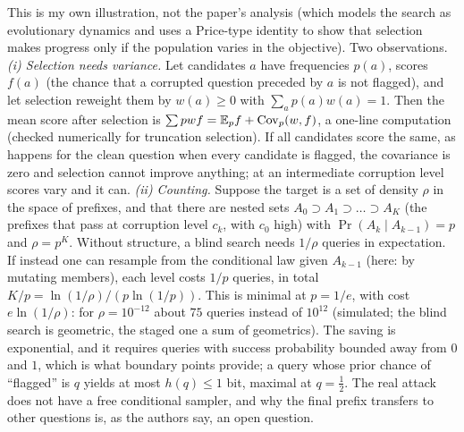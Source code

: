 \begin{beyond}\label{box:L8-curriculum}
This is my own illustration, not the paper's analysis (which models the search as evolutionary dynamics and uses a Price-type identity to show that selection makes progress only if the population varies in the objective). Two observations.
\emph{(i) Selection needs variance.} Let candidates $a$ have frequencies $p(a)$, scores $f(a)$ (the chance that a corrupted question preceded by $a$ is not flagged), and let selection reweight them by $w(a)\ge0$ with $\sum_ap(a)w(a)=1$. Then the mean score after selection is $\sum pwf=\mathbb{E}_pf+\operatorname{Cov}_p(w,f)$, a one-line computation (checked numerically for truncation selection). If all candidates score the same, as happens for the clean question when every candidate is flagged, the covariance is zero and selection cannot improve anything; at an intermediate corruption level scores vary and it can.
\emph{(ii) Counting.} Suppose the target is a set of density $\rho$ in the space of prefixes, and that there are nested sets $A_0\supset A_1\supset\dots\supset A_K$ (the prefixes that pass at corruption level $c_k$, with $c_0$ high) with $\Pr(A_k\mid A_{k-1})=p$ and $\rho=p^K$. Without structure, a blind search needs $1/\rho$ queries in expectation. If instead one can resample from the conditional law given $A_{k-1}$ (here: by mutating members), each level costs $1/p$ queries, in total $K/p=\ln(1/\rho)/(p\ln(1/p))$. This is minimal at $p=1/e$, with cost $e\ln(1/\rho)$: for $\rho=10^{-12}$ about $75$ queries instead of $10^{12}$ (simulated; the blind search is geometric, the staged one a sum of geometrics). The saving is exponential, and it requires queries with success probability bounded away from $0$ and $1$, which is what boundary points provide; a query whose prior chance of ``flagged'' is $q$ yields at most $h(q)\le1$ bit, maximal at $q=\tfrac12$. The real attack does not have a free conditional sampler, and why the final prefix transfers to other questions is, as the authors say, an open question.
\end{beyond}

